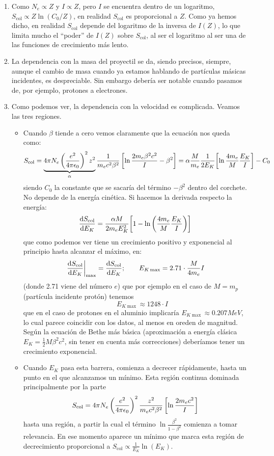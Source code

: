 \begin{enumerate}[label=\alph*)]
    \item Como $N_e \propto Z$ y $I \propto Z$, pero $I$ se encuentra dentro de un logaritmo, $S_{\text{col}} \propto Z \ln (C_0/Z)$, en realidad $S_{\text{col}}$ es proporcional a $Z$. Como ya hemos dicho, en realidad $S_{\text{col}}$ depende del logaritmo de la inversa de $I(Z)$, lo que limita mucho el ``poder'' de $I(Z)$ sobre $S_{\text{col}}$, al ser el logaritmo al ser una de las funciones de crecimiento más lento. 
    \item La dependencia con la masa del proyectil se da, siendo precisos, siempre, aunque el cambio de masa cuando ya estamos hablando de partículas másicas incidentes, es despreciable. Sin embargo debería ser notable cuando pasamos de, por ejemplo, protones a electrones. 
    \item Como podemos ver, la dependencia con la velocidad es complicada. Veamos las tres regiones.
    \begin{itemize}
        \item Cuando $\beta$ tiende a cero vemos claramente que la ecuación nos queda como: 
        \[
        S_\text{\text{col}} = \underbrace{4\pi N_e \left( \frac{e^2}{4\pi \epsilon_0} \right)^2 
        z^2}_{\alpha}\frac{1}{m_e c^2 \beta^2} 
        \left[ \ln \frac{2 m_e \beta^2 c^2}{I} - \beta^2 \right]  = \alpha \frac{M}{m_e} \frac{1}{2E_K} \bqty{\ln \frac{4m_e}{M}\frac{E_K}{I}} - C_0
        \] 
        siendo $C_0$ la constante que se sacaría del término $-\beta^2$ dentro del corchete. No depende de la energía cinética. Si hacemos la derivada respecto la energía: 
        \[
        \dv{S_{\text{col}}}{E_K} = \frac{\alpha M}{2m_e E_K^2} \bqty{ 1  - \ln \pqty{\frac{4m_e}{M}\frac{E_K}{I}}}
        \]
        que como podemos ver tiene un crecimiento positivo y exponencial al principio hasta alcanzar el máximo, en: 
        \[
        \left. \dv{S_{\text{col}}}{E_K}  \right|_{\max} =  \dv{S_{\text{col}}}{E_K} (E_{K\max}); \qquad E_{K\max} =2.71 \cdot  \frac{M}{4m_e} I
        \]
        (donde 2.71 viene del número $e$) que por ejemplo en el caso de $M=m_p$ (partícula incidente protón) tenemos
        \[ 
        \qquad E_{K\max} \approx 1248 \cdot I
        \]
        que en el caso de protones en el aluminio implicaría $E_{K\max} \approx 0.207 \unit{MeV}$, lo cual parece coincidir con los datos, al menos en oreden de magnitud. Según la ecuación de Bethe más básica (aproximación a energía clásica $E_K = \frac{1}{2} M\beta^2 c^2$, sin tener en cuenta más correcciones) deberíamos tener un crecimiento exponencial.
        \item Cuando $E_{K}$ pasa esta barrera, comienza a decrecer rápidamente, hasta un punto en el que alcanzamos un mínimo. Esta región continua dominada principalmente por la parte 
        \[
        S_\text{\text{col}} = 4\pi N_e \left( \frac{e^2}{4\pi \epsilon_0} \right)^2 
        \frac{z^2}{m_e c^2 \beta^2} 
        \left[ \ln \frac{2 m_e c^2}{I}  \right]
        \]
        hasta una región, a partir la cual el término $ \ln \frac{\beta^2}{1 - \beta^2} $ comienza a tomar relevancia. En ese momento aparece un mínimo que marca esta región de decrecimiento proporcional a $S_{\text{col}} \propto \frac{1}{E_K} \ln (E_K)$.        
        

\end{itemize}
\end{enumerate}
